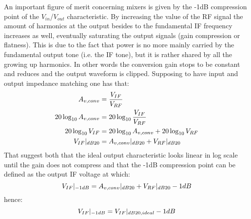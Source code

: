 An important figure of merit concerning mixers is given by the -1dB compression point of the $V_{in}$/$V_{out}$ characteristic. By increasing the value of the RF signal the amount of harmonics at the output besides to the fundamental IF frequency increases as well, eventually saturating the output signals (gain compression or flatness). This is due to the fact that power is no more mainly carried by the fundamental output tone (i.e. the IF tone), but it is rather shared by all the growing up harmonics. In other words the conversion gain stops to be constant and reduces and the output waveform is clipped. Supposing to have input and output impedance matching one has that:
\begin{align}
	A_{v,conv}&=\frac{V_{IF}}{V_{RF}} \notag \\
	20\log_{10}A_{v,conv} & = 20\log_{10}\frac{V_{IF}}{V_{RF}}  \notag \\
	20\log_{10}V_{IF} & = 20\log_{10}A_{v,conv} + 20\log_{10}V_{RF} \notag \\	V_{IF}|_{dB20} &= A_{v,conv}|_{dB20} + V_{RF}|_{dB20} \notag
\end{align}
That suggest both that the ideal output characteristic looks linear in log scale until the gain does not compress and that the -1dB compression point can be defined as the output IF voltage at which:
\begin{equation}
V_{IF}|_{-1dB} = A_{v,conv}|_{dB20} + V_{RF}|_{dB20} -1dB \notag
\end{equation}
hence:
\begin{equation}
V_{IF}|_{-1dB} = V_{IF}|_{dB20,ideal} -1dB \notag
\end{equation}

